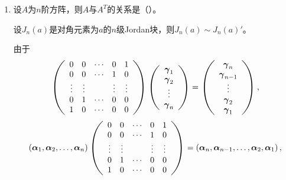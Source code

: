 \begin{enumerate}[1~]
\begin{enumerate}[1.~]
\item
设$A$为$n$阶方阵，则$A$与$A^T$的关系是（\quad）。
\begin{solution}
\begin{lemma}
设$J_n(a)$是对角元素为$a$的$n$级Jordan块，则$J_n(a)\sim J_n(a)'$。
\end{lemma}
\begin{subproof}
由于\[
\left( \begin{array} { c c c c c } { 0 } & { 0 } & { \cdots } & { 0 } & { 1 } \\ { 0 } & { 0 } & { \cdots } & { 1 } & { 0 } \\ { \vdots } & { \vdots } & { } & { \vdots } & { \vdots } \\ { 0 } & { 1 } & { \cdots } & { 0 } & { 0 } \\ { 1 } & { 0 } & { \cdots } & { 0 } & { 0 } \end{array} \right) \left( \begin{array} { c } { \boldsymbol{\gamma} _ { 1 } } \\ { \boldsymbol{\gamma} _ { 2 } } \\ { \vdots } \\ { \boldsymbol{\gamma} _ { n } } \end{array} \right) = \left( \begin{array} { c } { \boldsymbol{\gamma} _ { n } } \\ { \boldsymbol{\gamma} _ { n - 1 } } \\ { \vdots } \\ { \boldsymbol{\gamma} _ { 2 } } \\ { \boldsymbol{\gamma} _ { 1 } } \end{array} \right),
\]
\[
\left( \boldsymbol { \boldsymbol{\alpha} } _ { 1 } , \boldsymbol { \boldsymbol{\alpha} } _ { 2 } , \dots , \boldsymbol { \boldsymbol{\alpha} } _ { n } \right) \left( \begin{array} { c c c c c } { 0 } & { 0 } & { \cdots } & { 0 } & { 1 } \\ { 0 } & { 0 } & { \cdots } & { 1 } & { 0 } \\ { \vdots } & { \vdots } & { } & { \vdots } & { \vdots } \\ { 0 } & { 1 } & { \cdots } & { 0 } & { 0 } \\ { 1 } & { 0 } & { \cdots } & { 0 } & { 0 } \end{array} \right) = \left( \boldsymbol { \boldsymbol{\alpha} } _ { n } , \boldsymbol { \boldsymbol{\alpha} } _ { n - 1 } , \dots , \boldsymbol { \boldsymbol{\alpha} } _ { 2 } , \boldsymbol { \boldsymbol{\alpha} } _ { 1 } \right),
\]
\end{subproof}
\end{solution}
\end{enumerate}
\end{enumerate}

